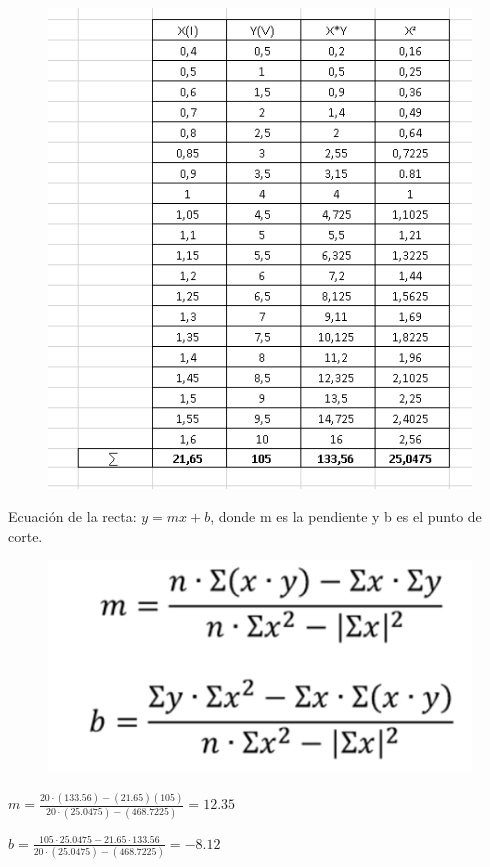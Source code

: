 \documentclass[10pt]{article}
\begin{document}
\begin{multicols}{2}
	\begin{figure}[H]
		\includegraphics[scale = .5]{./Images/TablaMMC.PNG}
	\end{figure}

	Ecuación de la recta: $y = mx + b$, donde m es la pendiente y b es el punto
	de corte.

	\begin{figure}[H]
		\includegraphics[scale = .5]{./Images/MMC.png}
	\end{figure}

	$m = \frac{20 \cdot (133.56) - (21.65)(105)}{20 \cdot (25.0475) - (468.7225)} = 12.35$

	$b = \frac{105 \cdot 25.0475 - 21.65 \cdot 133.56}{20 \cdot (25.0475) - (468.7225)} = -8.12$


\end{multicols}
\end{document}
